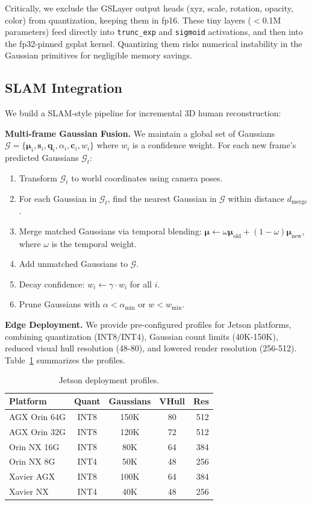 \documentclass[10pt,twocolumn,letterpaper]{article}
\begin{document}
Critically, we exclude the GSLayer output heads (xyz, scale, rotation,
opacity, color) from quantization, keeping them in fp16. These tiny layers
($<$0.1M parameters) feed directly into \texttt{trunc\_exp} and
\texttt{sigmoid} activations, and then into the fp32-pinned gsplat kernel.
Quantizing them risks numerical instability in the Gaussian primitives
for negligible memory savings.

\subsection{SLAM Integration}
\label{sec:slam}

We build a SLAM-style pipeline for incremental 3D human reconstruction:

\textbf{Multi-frame Gaussian Fusion.} We maintain a global set of
Gaussians $\mathcal{G} = \{\boldsymbol{\mu}_i, \mathbf{s}_i, \mathbf{q}_i,
\alpha_i, \mathbf{c}_i, w_i\}$ where $w_i$ is a confidence weight. For
each new frame's predicted Gaussians $\mathcal{G}_t$:

\begin{enumerate}
    \item Transform $\mathcal{G}_t$ to world coordinates using camera poses.
    \item For each Gaussian in $\mathcal{G}_t$, find the nearest Gaussian
    in $\mathcal{G}$ within distance $d_{\text{merge}}$.
    \item Merge matched Gaussians via temporal blending:
    $\boldsymbol{\mu} \leftarrow \omega \boldsymbol{\mu}_{\text{old}} +
    (1-\omega) \boldsymbol{\mu}_{\text{new}}$, where $\omega$ is the
    temporal weight.
    \item Add unmatched Gaussians to $\mathcal{G}$.
    \item Decay confidence: $w_i \leftarrow \gamma \cdot w_i$ for all $i$.
    \item Prune Gaussians with $\alpha < \alpha_{\text{min}}$ or
    $w < w_{\text{min}}$.
\end{enumerate}

\textbf{Edge Deployment.} We provide pre-configured profiles for Jetson
platforms, combining quantization (INT8/INT4), Gaussian count limits
(40K-150K), reduced visual hull resolution (48-80), and lowered render
resolution (256-512). Table~\ref{tab:profiles} summarizes the profiles.

\begin{table}[t]
\centering
\small
\caption{Jetson deployment profiles.}
\label{tab:profiles}
\begin{tabular}{lcccr}
\toprule
Platform & Quant & Gaussians & VHull & Res \\
\midrule
AGX Orin 64G & INT8 & 150K & 80 & 512 \\
AGX Orin 32G & INT8 & 120K & 72 & 512 \\
Orin NX 16G & INT8 & 80K & 64 & 384 \\
Orin NX 8G & INT4 & 50K & 48 & 256 \\
Xavier AGX & INT8 & 100K & 64 & 384 \\
Xavier NX & INT4 & 40K & 48 & 256 \\
\bottomrule
\end{tabular}
\end{table}
\end{document}
